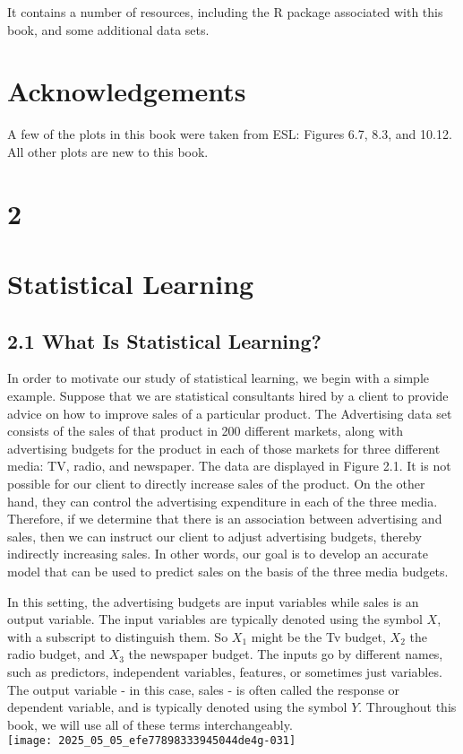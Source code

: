 \documentclass[10pt]{article}
\begin{document}
It contains a number of resources, including the R package associated with this book, and some additional data sets.

\section*{Acknowledgements}
A few of the plots in this book were taken from ESL: Figures 6.7, 8.3, and 10.12. All other plots are new to this book.


\section*{2}
\section*{Statistical Learning}
\subsection*{2.1 What Is Statistical Learning?}
In order to motivate our study of statistical learning, we begin with a simple example. Suppose that we are statistical consultants hired by a client to provide advice on how to improve sales of a particular product. The Advertising data set consists of the sales of that product in 200 different markets, along with advertising budgets for the product in each of those markets for three different media: TV, radio, and newspaper. The data are displayed in Figure 2.1. It is not possible for our client to directly increase sales of the product. On the other hand, they can control the advertising expenditure in each of the three media. Therefore, if we determine that there is an association between advertising and sales, then we can instruct our client to adjust advertising budgets, thereby indirectly increasing sales. In other words, our goal is to develop an accurate model that can be used to predict sales on the basis of the three media budgets.

In this setting, the advertising budgets are input variables while sales is an output variable. The input variables are typically denoted using the symbol $X$, with a subscript to distinguish them. So $X_{1}$ might be the Tv budget, $X_{2}$ the radio budget, and $X_{3}$ the newspaper budget. The inputs go by different names, such as predictors, independent variables, features, or sometimes just variables. The output variable - in this case, sales - is often called the response or dependent variable, and is typically denoted using the symbol $Y$. Throughout this book, we will use all of these terms interchangeably.\\
\texttt{[image: 2025\_05\_05\_efe77898333945044de4g-031]}
\end{document}
